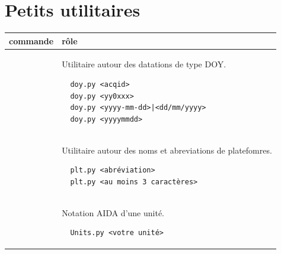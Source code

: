 \section{Petits utilitaires}

\begin{center}
\tablefirsthead{}
\tabletail{\hline}
\tablelasttail{}

\begin{supertabular}{|p{6cm}|p{9cm}|}
\hline
\textbf{commande} &
\textbf{rôle}
\\ \hline

 &
Utilitaire autour des datations de type DOY.
\begin{verbatim}
  doy.py <acqid>
  doy.py <yy0xxx>
  doy.py <yyyy-mm-dd>|<dd/mm/yyyy>
  doy.py <yyyymmdd>
\end{verbatim}
\\ \hline

 &
Utilitaire autour des noms et abreviations de platefomres.
\begin{verbatim}
  plt.py <abréviation>
  plt.py <au moins 3 caractères>
\end{verbatim}
\\ \hline

 &
Notation AIDA d'une unité.
\begin{verbatim}
  Units.py <votre unité>
\end{verbatim}
\\ \hline

\end{supertabular}
\end{center}

